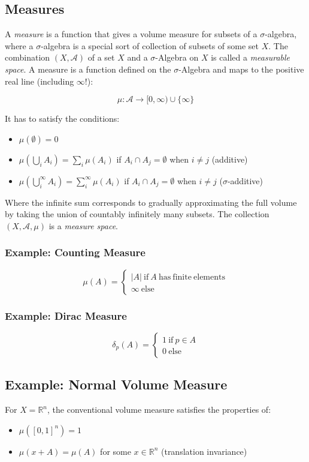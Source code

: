 \subsection{Measures}
A \textit{measure} is a function that gives a volume measure for subsets of a $\sigma$-algebra, where a $\sigma$-algebra is a special sort of collection of subsets of some set $X$. 
The combination $(X,\mathscr{A})$ of a set $X$ and a $\sigma$-Algebra on $X$ is called a \textit{measurable space}. A measure is a function defined on the $\sigma$-Algebra and maps to the positive real line (including $\infty$!):

\begin{equation}
\mu: \mathscr{A} \rightarrow [0,\infty)\cup\{\infty\} 
\end{equation}

It has to satisfy the conditions:

\begin{itemize}
\item $\mu(\emptyset) = 0$
\item $\mu(\bigcup_i A_i) = \sum_i \mu(A_i)$ if $A_i \cap A_j = \emptyset$ when $i\neq j$ (additive)
\item $\mu(\bigcup^{\infty}_i A_i) = \sum^{\infty}_i \mu(A_i)$ if $A_i \cap A_j = \emptyset$ when $i\neq j$ ($\sigma$-additive) 
\end{itemize}

Where the infinite sum corresponds to gradually approximating the full volume by taking the union of countably infinitely many subsets. The collection $(X,\mathscr{A},\mu)$ is a \textit{measure space}.

\subsubsection{Example: Counting Measure}

\begin{equation}
\mu(A) = \left\{\begin{array}{l} |A| \mathrm{\ if\ }A\mathrm{\ has\ finite\ elements}\\ \infty\mathrm{\ else}\end{array}\right.
\end{equation}

\subsubsection{Example: Dirac Measure}
\begin{equation}
\delta_p(A) = \left\{\begin{array}{l} 1 \mathrm{\ if\ }p\in A\\ 0 \mathrm{\ else} \end{array}\right.
\end{equation}

\subsection{Example: Normal Volume Measure}
For $X=\mathbb{R}^n$, the conventional volume measure satisfies the properties of:

\begin{itemize}
\item $\mu([0,1]^n) = 1$
\item $\mu(x + A) = \mu(A)$ for some $x\in \mathbb{R}^n$ (translation invariance)
\end{itemize}
